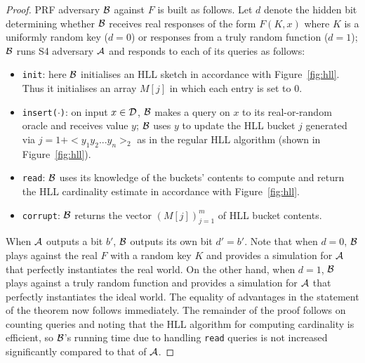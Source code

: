 \documentclass{article}
\begin{document}
\begin{proof}
PRF adversary ${\cal B}$ against $F$ is built as follows. Let $d$ denote the hidden bit determining whether ${\cal B}$ receives real responses of the form $F(K,x)$ where $K$ is a uniformly random key ($d=0$) or responses from a truly random function ($d=1$); ${\cal B}$ runs S4 adversary ${\cal A}$ and responds to each of its queries as follows:
\begin{itemize}
\item \texttt{init}: here ${\cal B}$ initialises an HLL sketch in accordance with Figure~\ref{fig:hll}. Thus it initialises an array $M[j]$ in which each entry is set to 0. 
\item \texttt{insert($\cdot$)}: on input $x \in {\cal D}$,  ${\cal B}$ makes a query on $x$ to its real-or-random oracle and receives value $y$; ${\cal B}$ uses $y$ to update the HLL bucket $j$ generated via $j=1 + <y_1y_2...y_{n}>_2$ as in the regular HLL algorithm (shown in Figure~\ref{fig:hll}).
\item \texttt{read}: ${\cal B}$ uses its knowledge of the buckets' contents to compute and return the HLL cardinality estimate in accordance with Figure~\ref{fig:hll}. 
\item \texttt{corrupt}: ${\cal B}$ returns the vector $(M[j])_{j=1}^{m}$ of HLL bucket contents. 
\end{itemize}
When ${\cal A}$ outputs a bit $b'$, ${\cal B}$ outputs its own bit $d'=b'$. Note that when $d=0$, ${\cal B}$ plays against the real $F$ with a random key $K$ and provides a simulation for ${\cal A}$ that perfectly instantiates the real world. On the other hand, when $d=1$, ${\cal B}$ plays against a truly random function and provides a simulation for ${\cal A}$ that perfectly instantiates the ideal world. The equality of advantages in the statement of the theorem now follows immediately. The remainder of the proof follows on counting queries and noting that the HLL algorithm for computing cardinality is efficient, so ${\cal B}$'s running time due to handling \texttt{read} queries is not increased significantly compared to that of ${\cal A}$.
\end{proof}
\end{document}
